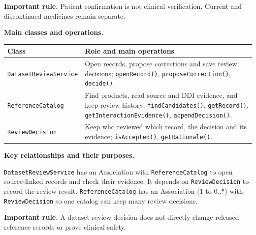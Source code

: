 \noindent\textbf{Important rule.} Patient confirmation is not clinical
verification. Current and discontinued medicines remain separate.



\noindent\textbf{Main classes and operations.}\par\smallskip
\begingroup\small
\noindent\begin{tabularx}{\textwidth}{|L{0.34\textwidth}|Y|}
\hline
\textbf{Class} & \textbf{Role and main operations} \\ \hline
\texttt{DatasetReviewService} & Open records, propose corrections and save review decisions; \texttt{openRecord()}, \texttt{proposeCorrection()}, \texttt{decide()}. \\ \hline
\texttt{ReferenceCatalog} & Find products, read source and DDI evidence, and keep review history; \texttt{findCandidates()}, \texttt{getRecord()}, \texttt{getInteractionEvidence()}, \texttt{appendDecision()}. \\ \hline
\texttt{ReviewDecision} & Keep who reviewed which record, the decision and its evidence; \texttt{isAccepted()}, \texttt{getRationale()}. \\ \hline
\end{tabularx}\par
\endgroup

\noindent\textbf{Key relationships and their purposes.}\par\smallskip
\texttt{DatasetReviewService} has an Association with
\texttt{ReferenceCatalog} to open source-linked records and check their
evidence. It depends on \texttt{ReviewDecision} to record the review result.
\texttt{ReferenceCatalog} has an Association (1 to 0..*) with
\texttt{ReviewDecision} so one catalog can keep many review decisions.

\noindent\textbf{Important rule.} A dataset review decision does not directly
change released reference records or prove clinical safety.




